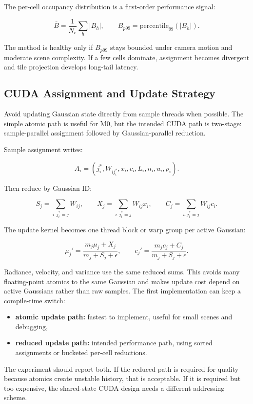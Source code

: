 \documentclass[11pt]{article}
\begin{document}
The per-cell occupancy distribution is a first-order performance signal:

\[
  \bar{B}=\frac{1}{N_c}\sum_h |B_h|,
  \qquad
  B_{p99}=\mathrm{percentile}_{99}(|B_h|).
\]

The method is healthy only if $B_{p99}$ stays bounded under camera motion and
moderate scene complexity. If a few cells dominate, assignment becomes
divergent and tile projection develops long-tail latency.

\subsection{CUDA Assignment and Update Strategy}

Avoid updating Gaussian state directly from sample threads when possible. The
simple atomic path is useful for M0, but the intended CUDA path is two-stage:
sample-parallel assignment followed by Gaussian-parallel reduction.

Sample assignment writes:

\[
  A_i=(j_i^*, W_{ij_i^*}, x_i,c_i,L_i,n_i,u_i,\rho_i).
\]

Then reduce by Gaussian ID:

\[
  S_j = \sum_{i:j_i^*=j} W_{ij},
  \qquad
  X_j = \sum_{i:j_i^*=j} W_{ij}x_i,
  \qquad
  C_j = \sum_{i:j_i^*=j} W_{ij}c_i.
\]

The update kernel becomes one thread block or warp group per active Gaussian:

\[
  \mu_j' =
  \frac{m_j\mu_j+X_j}{m_j+S_j+\epsilon},
  \qquad
  c_j' =
  \frac{m_jc_j+C_j}{m_j+S_j+\epsilon}.
\]

Radiance, velocity, and variance use the same reduced sums. This avoids many
floating-point atomics to the same Gaussian and makes update cost depend on
active Gaussians rather than raw samples. The first implementation can keep a
compile-time switch:

\begin{itemize}
  \item \textbf{atomic update path:} fastest to implement, useful for small
        scenes and debugging,
  \item \textbf{reduced update path:} intended performance path, using sorted
        assignments or bucketed per-cell reductions.
\end{itemize}

The experiment should report both. If the reduced path is required for quality
because atomics create unstable history, that is acceptable. If it is required
but too expensive, the shared-state CUDA design needs a different addressing
scheme.
\end{document}
